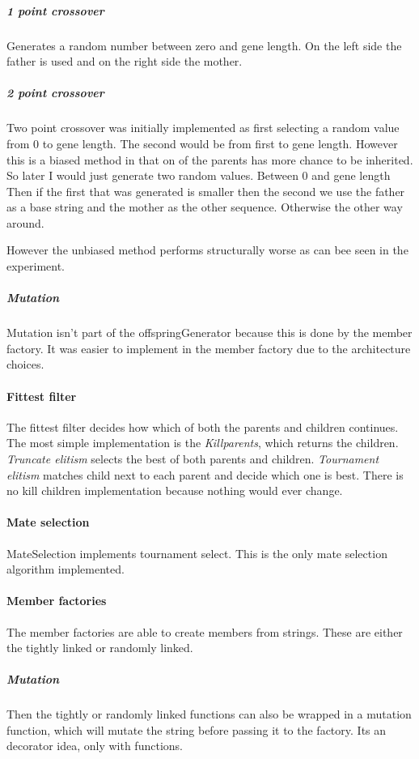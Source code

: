 \documentclass{article}
\begin{document}
\begin{empfile}
\subparagraph{1 point crossover}
Generates a random number between zero and gene length. On the left side 
the father is used and on the right side the mother.

\subparagraph{2 point crossover}
Two point crossover was initially implemented
as first selecting a random value from 0 to gene length. The second would
be from first to gene length. However this is a biased method in that
on of the parents has more chance to be inherited. So
later I would just generate two random values. Between 0 and gene length
Then if the first that was generated is smaller then the second we use
the father as a base string and the mother as the other sequence. Otherwise
the other way around.

However the unbiased method performs structurally worse as can bee seen
in the experiment.

\subparagraph{Mutation}
Mutation isn't part of the offspringGenerator
because this is done by the member factory. It was easier to implement
in the member factory due to the architecture choices.

\label{paragraph:Fittest filter}
\paragraph{Fittest filter} The fittest filter decides how which of both
the parents and children continues.
The most simple implementation is the \emph{Killparents}, which
returns the children. \emph{Truncate elitism} selects the best of both parents
and children. \emph{Tournament elitism} matches child next to each parent
and decide which one is best. There is no kill children implementation
because nothing would ever change.

\paragraph{Mate selection} MateSelection implements tournament select.
This is the only mate selection algorithm implemented.

\paragraph{Member factories} The member factories are able to create
members from strings. These are either the tightly linked or randomly
linked.

\subparagraph{Mutation} Then the tightly or randomly linked
functions can also be wrapped in a mutation function,
which will mutate the string before passing it to the factory.
Its an decorator idea, only with functions.
\newpage


\end{empfile}
\end{document}
